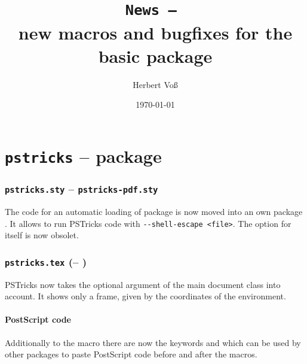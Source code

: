 \documentclass[11pt,english,BCOR10mm,DIV12,bibliography=totoc,parskip=false,smallheadings
    headexclude,footexclude,oneside]{pst-doc}
\begin{document}
\title{\texttt{News -- \the\year}\\ \Large new macros and bugfixes for the
basic package }
\author{Herbert Voß}
\date{\today}

\maketitle

\clearpage
\tableofcontents

\clearpage
\part{\texttt{pstricks} -- package}

\section{\texttt{pstricks.sty} -- \texttt{pstricks-pdf.sty}}
The code for an automatic loading of package  is now moved
into an own package . It allows to run PSTricks code with  \texttt{-{}-shell-escape <file>}.
The option  for  itself is now obsolet.
 
\section{\texttt{pstricks.tex} (\pstricksFV -- \pstricksFD)}

PSTricks now takes the optional argument  of the main document class
into account. It shows only a frame, given by the coordinates of the 
environment.



\subsection{PostScript code}
Additionally to the macro  there are now the keywords
 and  which can be used by other
packages to paste PostScript code before and after the macros.
\end{document}
